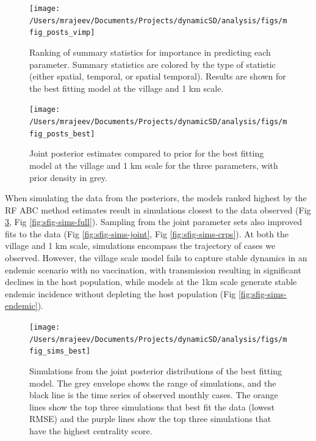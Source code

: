 \documentclass[
  oneside]{book}
\begin{document}
\begin{figure}
\texttt{[image: /Users/mrajeev/Documents/Projects/dynamicSD/analysis/figs/mfig\_posts\_vimp]} \caption[Ranking of summary statistics for importance in predicting each parameter.]{Ranking of summary statistics for importance in predicting each parameter. Summary statistics are colored by the type of statistic (either spatial, temporal, or spatial temporal). Results are shown for the best fitting model at the village and 1 km scale.}\label{fig:mfig-posts-vimp}
\end{figure}



\begin{figure}
\texttt{[image: /Users/mrajeev/Documents/Projects/dynamicSD/analysis/figs/mfig\_posts\_best]} \caption[Independent and joint posterior parameter estimates for the best fitting model across scales.]{Joint posterior estimates compared to prior for the best fitting model at the village and 1 km scale for the three parameters, with prior density in grey.}\label{fig:mfig-posts-best}
\end{figure}



When simulating the data from the posteriors, the models ranked highest by the RF ABC method estimates result in simulations closest to the data observed (Fig \ref{fig:mfig-sims-best}, Fig \ref{fig:sfig-sims-full}). Sampling from the joint parameter sets also improved fits to the data (Fig \ref{fig:sfig-sims-joint}, Fig \ref{fig:sfig-sims-crps}). At both the village and 1 km scale, simulations encompass the trajectory of cases we observed. However, the village scale model fails to capture stable dynamics in an endemic scenario with no vaccination, with transmission resulting in significant declines in the host population, while models at the 1km scale generate stable endemic incidence without depleting the host population (Fig \ref{fig:sfig-sims-endemic}).

\begin{figure}
\texttt{[image: /Users/mrajeev/Documents/Projects/dynamicSD/analysis/figs/mfig\_sims\_best]} \caption[Simulations from the joint posterior distributions of the best fitting model.]{Simulations from the joint posterior distributions of the best fitting model. The grey envelope shows the range of simulations, and the black line is the time series of observed monthly cases. The orange lines show the top three simulations that best fit the data (lowest RMSE) and the purple lines show the top three simulations that have the highest centrality score.}\label{fig:mfig-sims-best}
\end{figure}
\end{document}

